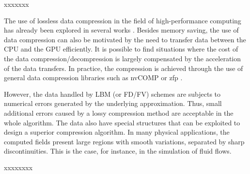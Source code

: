 \begin{pasted}
xxxxxxx

The use of lossless data compression in the field of high-performance computing has already been explored in several works \cite{astsatryan2020performance,low_latency_LZ4_FPGA}.
Besides memory saving, the use of data compression can also be motivated by the need to transfer data between the CPU and the GPU efficiently.
It is possible to find situations where the cost of the data compression/decompression is largely compensated by the acceleration of the data transfers.
In practice, the compression is achieved through the use of general data compression libraries such as nvCOMP \cite{nvcomp_2020} or zfp \cite{lindstrom2014fixed}.

However, the data handled by LBM (or FD/FV) schemes are subjects to numerical errors generated by the underlying approximation.
Thus, small additional errors caused by a lossy compression method  are acceptable in the whole algorithm.
The data also have special structures that can be exploited to design a superior compression algorithm.
In many physical applications, the computed fields present large regions with smooth variations, separated by sharp discontinuities.
This is the case, for instance, in the simulation of fluid flows.

xxxxxxxx
\end{pasted}




